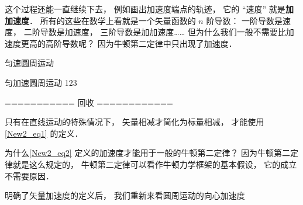 这个过程还能一直继续下去， 例如画出加速度端点的轨迹， 它的 “速度” 就是\textbf{加加速度}． 所有的这些在数学上看就是一个矢量函数的 $n$ 阶导数： 一阶导数是速度， 二阶导数是加速度， 三阶导数是加加速度…… 但为什么我们一般不需要比加速度更高的高阶导数呢？ 因为牛顿第二定律中只出现了加速度．

\begin{example}{匀速圆周运动}
\end{example}

\begin{example}{匀加速圆周运动}
123
\end{example}

=========== 回收 ============

只有在直线运动的特殊情况下， 矢量相减才简化为标量相减， 才能使用\autoref{New2_eq1} 的定义．

为什么\autoref{New2_eq2} 定义的加速度才能用于一般的牛顿第二定律？ 因为牛顿第二定律就是这么规定的， 牛顿第二定律可以看作牛顿力学框架的基本假设， 它的成立不需要原因．

明确了矢量加速度的定义后， 我们重新来看圆周运动的向心加速度


